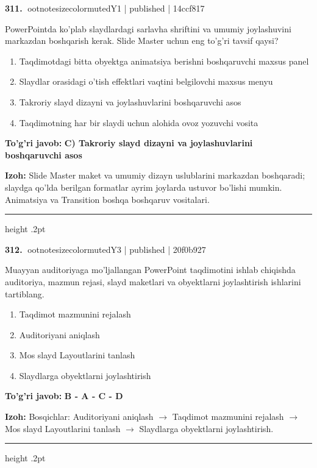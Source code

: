\documentclass[10pt,a4paper]{article}
\begin{document}
\textbf{\color{ink}311.} {ootnotesizecolor{muted}Y1 | published | 14ccf817}
\par
PowerPointda ko'plab slaydlardagi sarlavha shriftini va umumiy joylashuvini markazdan boshqarish kerak. Slide Master uchun eng to'g'ri tavsif qaysi?
\begin{enumerate}[label=\Alph*),leftmargin=9mm]
\item Taqdimotdagi bitta obyektga animatsiya berishni boshqaruvchi maxsus panel
\item Slaydlar orasidagi o'tish effektlari vaqtini belgilovchi maxsus menyu
\item Takroriy slayd dizayni va joylashuvlarini boshqaruvchi asos
\item Taqdimotning har bir slaydi uchun alohida ovoz yozuvchi vosita
\end{enumerate}
\begin{tcolorbox}[enhanced,breakable,colback=teal!4,colframe=teal!55!black,boxrule=0.45pt,arc=1.2mm,left=2.8mm,right=2.8mm,top=2mm,bottom=2mm]
\textbf{\color{teal}To'g'ri javob:} \textbf{C) Takroriy slayd dizayni va joylashuvlarini boshqaruvchi asos}
\par\smallskip
\textbf{Izoh:} Slide Master maket va umumiy dizayn uslublarini markazdan boshqaradi; slaydga qo'lda berilgan formatlar ayrim joylarda ustuvor bo'lishi mumkin. Animatsiya va Transition boshqa boshqaruv vositalari.
\end{tcolorbox}
\vspace{2mm}\hrule height .2pt\vspace{2mm}

\textbf{\color{ink}312.} {ootnotesizecolor{muted}Y3 | published | 20f0b927}
\par
Muayyan auditoriyaga mo'ljallangan PowerPoint taqdimotini ishlab chiqishda auditoriya, mazmun rejasi, slayd maketlari va obyektlarni joylashtirish ishlarini tartiblang.
\begin{enumerate}[label=\Alph*),leftmargin=9mm]
\item Taqdimot mazmunini rejalash
\item Auditoriyani aniqlash
\item Mos slayd Layoutlarini tanlash
\item Slaydlarga obyektlarni joylashtirish
\end{enumerate}
\begin{tcolorbox}[enhanced,breakable,colback=teal!4,colframe=teal!55!black,boxrule=0.45pt,arc=1.2mm,left=2.8mm,right=2.8mm,top=2mm,bottom=2mm]
\textbf{\color{teal}To'g'ri javob:} \textbf{B - A - C - D}
\par\smallskip
\textbf{Izoh:} Bosqichlar: Auditoriyani aniqlash \ensuremath{\rightarrow} Taqdimot mazmunini rejalash \ensuremath{\rightarrow} Mos slayd Layoutlarini tanlash \ensuremath{\rightarrow} Slaydlarga obyektlarni joylashtirish.
\end{tcolorbox}
\vspace{2mm}\hrule height .2pt\vspace{2mm}
\end{document}
